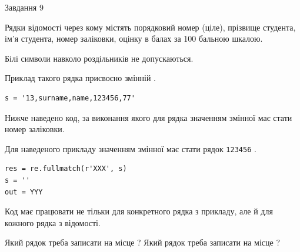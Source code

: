 \documentclass[12pt, ukrainian]{article}
\def\code#1{\Verb!#1!}
\begin{document}
{\begin{minipage}[t]{8.0cm}
\end{minipage}

               
{\begin{center}Завдання {9}\end{center}}
\vspace{-4mm}
Рядки відомості через кому містять порядковий номер (ціле), пріз\-ви\-ще студен\-та, ім'я студента, номер заліковки, оцінку в балах за 100 бальною шкалою.

Білі символи навколо роздільників не допускаються.

Приклад такого рядка присвоєно змінній .



\begin{verbatim}
s = '13,surname,name,123456,77'
\end{verbatim}


Нижче наведено код, за виконання якого для рядка  значенням змінної  має стати номер заліковки.

Для наведеного прикладу значенням змінної  має стати рядок \code{123456} .



\begin{verbatim}
res = re.fullmatch(r'XXX', s)
s = ''
out = YYY
\end{verbatim}


Код має працювати не тільки для конкретного рядка з прикладу, але й для кожного рядка з відомості.


Який рядок треба записати на місце  ?
Який рядок треба записати на місце  ?\par

}
\newpage
\end{document}
